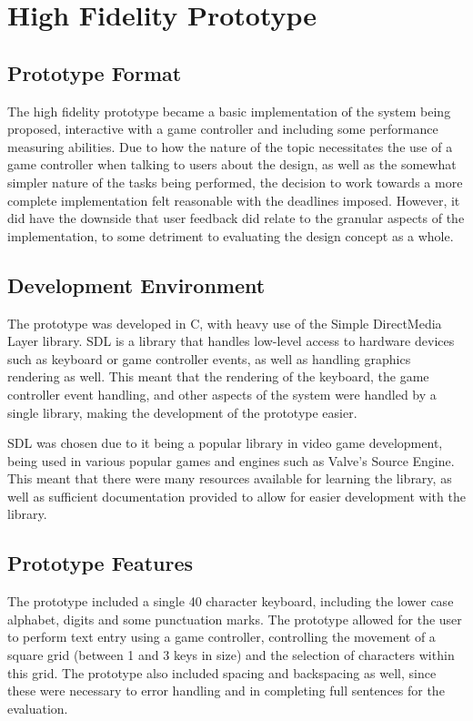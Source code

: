 \documentclass[prototype.tex]{subfiles}
\begin{document}
\section{High Fidelity Prototype} %
\label{sec:high_fidelity_prototype}
\subsection{Prototype Format} %
\label{sub:prototype_format}
The high fidelity prototype became a basic implementation of the system being
proposed, interactive with a game controller and including some performance
measuring abilities. Due to how the nature of the topic necessitates the use of
a game controller when talking to users about the design, as well as the
somewhat simpler nature of the tasks being performed, the decision to work
towards a more complete implementation felt reasonable with the deadlines
imposed. However, it did have the downside that user feedback did relate to the
granular aspects of the implementation, to some detriment to evaluating the
design concept as a whole.

\subsection{Development Environment} %
\label{sub:development_environment}
The prototype was developed in C, with heavy use of the Simple DirectMedia Layer
library. SDL is a library that handles low-level access to hardware devices such
as keyboard or game controller events, as well as handling graphics rendering as
well. This meant that the rendering of the keyboard, the game controller event
handling, and other aspects of the system were handled by a single library,
making the development of the prototype easier.

SDL was chosen due to it being a popular library in video game
development, being used in various popular games and engines such as Valve's
Source Engine. This meant that there were many resources available for learning
the library, as well as sufficient documentation provided to allow for easier
development with the library.

\subsection{Prototype Features} %
\label{sub:prototype_features}
The prototype included a single 40 character keyboard, including the lower case
alphabet, digits and some punctuation marks. The prototype allowed for the user
to perform text entry using a game controller, controlling the movement of a
square grid (between 1 and 3 keys in size) and the selection of characters
within this grid. The prototype also included spacing and backspacing as well,
since these were necessary to error handling and in completing full sentences
for the evaluation.
\end{document}
